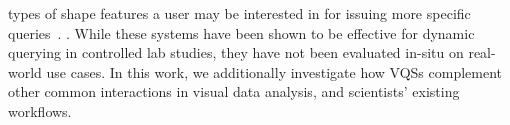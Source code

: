 types of shape features a user may be interested in for issuing more specific queries~\cite{correll2016semantics,Gregory2012}. . While these systems have been shown to be effective for dynamic querying in controlled lab studies, they have not been evaluated in-situ on real-world use cases. In this work, we additionally investigate how VQSs complement other common interactions in visual data analysis, and scientists' existing workflows.
